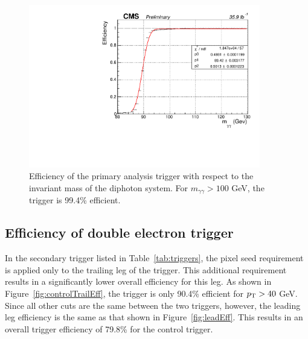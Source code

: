 \begin{figure}[h]
\begin{center}
\includegraphics[width=0.9\textwidth]{Figures/Trigger/InvMassEff.pdf}
\end{center}
\caption[Efficiency of the primary analysis trigger with respect to the invariant mass of the diphoton system.]
{Efficiency of the primary analysis trigger with respect to the invariant mass of the diphoton system. 
For $m_{\gamma\gamma} > 100$ GeV, the trigger is 99.4\% efficient.}
\label{fig:InvMassEff}
\end{figure}

\subsection{Efficiency of double electron trigger}
\label{sec:eeEff}
In the secondary trigger listed in Table~\ref{tab:triggers}, the pixel seed requirement is applied only to the trailing
leg of the trigger. This additional requirement results in a significantly lower overall efficiency for this leg. As shown in Figure~\ref{fig:controlTrailEff},
the trigger is only 90.4\% efficient for $p_{\mathrm{T}} > 40$ GeV.
Since all other cuts are the same between the two triggers, however, the leading leg efficiency is the same as that shown in Figure~\ref{fig:leadEff}.
This results in an overall trigger efficiency of 79.8\% for the control trigger.

